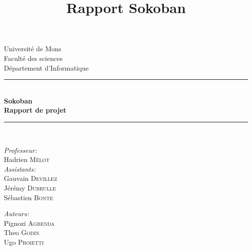 \documentclass{article}
\title{Rapport Sokoban}
\author{ }
\date{ }
\begin{document}
\begin{titlepage}
    \begin{center}
        
        {\Large Université de Mons}\\[1ex]
        {\Large Faculté des sciences}\\[1ex]
        {\Large Département d'Informatique}\\[2.5cm]
        
        \newcommand{\HRule}{\rule{\linewidth}{0.3mm}}
        \HRule \\[0.3cm]
        { \LARGE \bfseries Sokoban \\[0.3cm]}
        { \LARGE \bfseries Rapport de projet \\[0.1cm]} %
        \HRule \\[1.5cm]
        
        \begin{minipage}[t]{0.45\textwidth}
            \begin{flushleft} \large
                \emph{Professeur:}\\
                Hadrien \textsc{Mélot}\\
                \emph{Assistants:}\\
                Gauvain \textsc{Devillez}\\
                Jérémy \textsc{Dubrulle}\\
                Sébastien \textsc{Bonte}\\
            \end{flushleft}
        \end{minipage}
        \begin{minipage}[t]{0.45\textwidth}
            \begin{flushright} \large
                \emph{Auteurs:} \\
                Pignozi \textsc{Agbenda} \\
                Theo \textsc{Godin} \\
                Ugo \textsc{Proietti}
            \end{flushright}
        \end{minipage}\\[2ex]
        
        \vfill
        

\end{center}
\end{titlepage}
\end{document}
